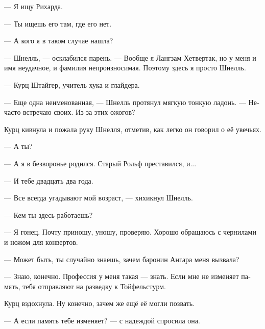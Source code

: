 \documentclass[a4paper,12pt,fleqn]{book}\usepackage{polyglossia}\setdefaultlanguage[babelshorthands=true]{russian}\setotherlanguage{english}\defaultfontfeatures{Ligatures=TeX,Mapping=tex-text}\usepackage{xcolor}\newcommand{\ml}[3]{#2}
\begin{document}
--- Я ищу Рихарда.

--- Ты ищешь его там, где его нет.

--- А кого я в таком случае нашла?

--- Шнелль, --- осклабился парень.
--- Вообще я Лангзам Хетвертак, но у меня и имя неудачное, и фамилия непроизносимая.
Поэтому здесь я просто Шнелль.

--- Курц Штайгер, учитель хука и глайдера.

--- Еще одна неименованная, --- Шнелль протянул мягкую тонкую ладонь.
--- Нечасто встречаю своих.
Из-за этих ожогов?

Курц кивнула и пожала руку Шнелля, отметив, как легко он говорил о её увечьях.

--- А ты?

--- А я в безворонье родился.
Старый Рольф преставился, и...

--- И тебе двадцать два года.

--- Все всегда угадывают мой возраст, --- хихикнул Шнелль.

--- Кем ты здесь работаешь?

--- Я гонец.
Почту приношу, уношу, проверяю.
Хорошо обращаюсь с чернилами и ножом для конвертов.

\ml{$0$}
{--- Может быть, ты случайно знаешь, зачем баронин Ангара меня вызвала?}
{``Maybe you know by chance, why Baronin Angara paged me?''}

\ml{$0$}
{--- Знаю, конечно.}
{``Of course I know.}
\ml{$0$}
{Профессия у меня такая --- знать.}
{That's my job, to know.}
\ml{$0$}
{Если мне не изменяет память, тебя отправляют на разведку к Тойфельстурм.}
{If I recall correctly, you're ordered to scout Teufelsturm.''}

Курц вздохнула.
Ну конечно, зачем же ещё её могли позвать.

\ml{$0$}
{--- А если память тебе изменяет? --- с надеждой спросила она.}
{``Is there any chance you recall incorrectly?'' she asked with hope.}
\end{document}
